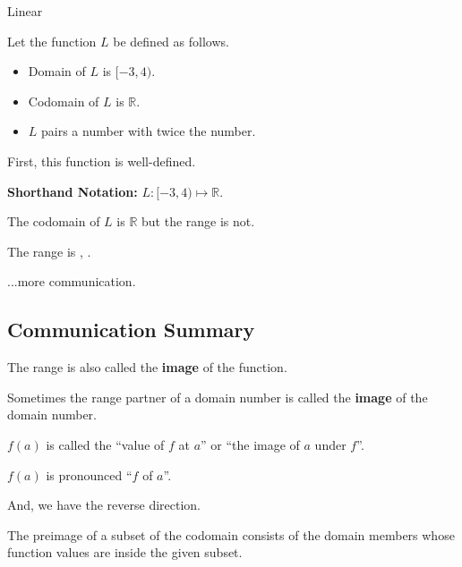 \documentclass{ximera}
\begin{document}
\begin{example} Linear 

Let the function $L$ be defined as follows.


\begin{itemize}
\item Domain of $L$ is $[-3, 4)$.
\item Codomain of $L$ is $\mathbb{R}$.
\item $L$ pairs a number with twice the number.
\end{itemize}


First, this function is well-defined. 


\textbf{Shorthand Notation: } $L: [-3, 4) \mapsto \mathbb{R}$.

\begin{question}

The codomain of $L$ is $\mathbb{R}$ but the range is not.  

The range is \wordChoice{\choice[correct]{[}\choice{(}}  ,  \wordChoice{\choice{]}\choice[correct]{)}}.

\end{question}



\end{example}
...more communication. 






\subsection*{Communication Summary}







The range is also called the \textbf{image} of the function.   

Sometimes the range partner of a domain number is called the \textbf{image} of the domain number.

$f(a)$ is called the ``value of $f$ at $a$'' or ``the image of $a$ under $f$''.


$f(a)$ is pronounced ``$f$ of $a$''.


And, we have the reverse direction.

The preimage of a subset of the codomain consists of the domain members whose function values are inside the given subset.
\end{document}
